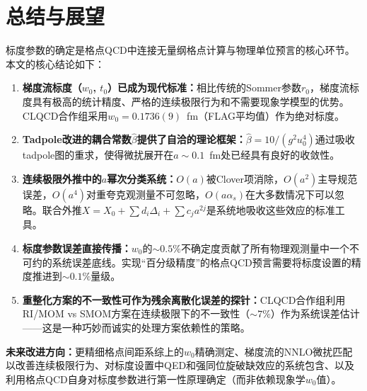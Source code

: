 \documentclass[12pt,a4paper]{ctexart}
\theoremstyle{definition}
\begin{document}
\section{总结与展望}

标度参数的确定是格点QCD中连接无量纲格点计算与物理单位预言的核心环节。本文的核心结论如下：

\begin{enumerate}
    \item \textbf{梯度流标度（$w_0$, $t_0$）已成为现代标准：}相比传统的Sommer参数$r_0$，梯度流标度具有极高的统计精度、严格的连续极限行为和不需要现象学模型的优势。CLQCD合作组采用$w_0 = 0.1736(9)$~fm（FLAG平均值）作为绝对标度\cite{CLQCD2024charm,CLQCD2025quark_mass}。

    \item \textbf{Tadpole改进的耦合常数$\hat{\beta}$提供了自洽的理论框架：}$\hat{\beta} = 10/(g^2 u^4_0)$通过吸收tadpole图的重求，使得微扰展开在$a \sim 0.1$~fm处已经具有良好的收敛性。

    \item \textbf{连续极限外推中的$a$幂次分类系统：}$O(a)$被Clover项消除，$O(a^2)$主导规范误差，$O(a^4)$对重夸克观测量不可忽略，$O(a\alpha_s)$在大多数情况下可以忽略。联合外推$X = X_0 + \sum d_i\Delta_i + \sum c_j a^{2j}$是系统地吸收这些效应的标准工具\cite{CLQCD2024charm}。

    \item \textbf{标度参数误差直接传播：}$w_0$的$\sim 0.5\%$不确定度贡献了所有物理观测量中一个不可约的系统误差底线。实现``百分级精度''的格点QCD预言需要将标度设置的精度推进到$\sim 0.1\%$量级。

    \item \textbf{重整化方案的不一致性可作为残余离散化误差的探针：}CLQCD合作组利用RI/MOM vs SMOM方案在连续极限下的不一致性（$\sim 7\%$）作为系统误差估计\cite{CLQCD2025quark_mass}——这是一种巧妙而诚实的处理方案依赖性的策略。
\end{enumerate}

\textbf{未来改进方向：}更精细格点间距系综上的$w_0$精确测定、梯度流的NNLO微扰匹配以改善连续极限行为、对标度设置中QED和强同位旋破缺效应的系统包含、以及利用格点QCD自身对标度参数进行第一性原理确定（而非依赖现象学$w_0$值）。
\end{document}
